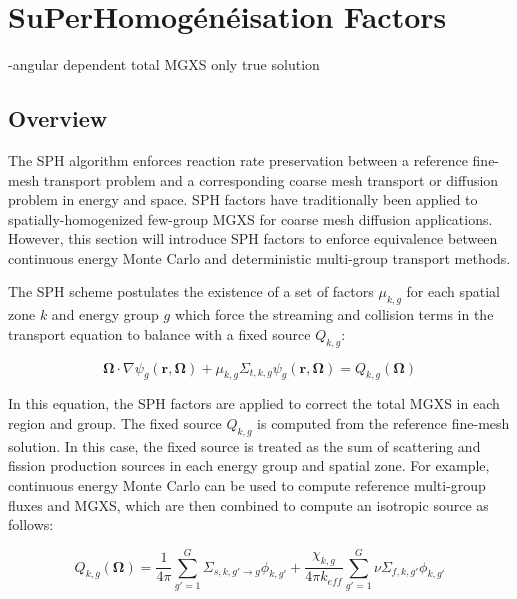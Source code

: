 \section{SuPerHomog\'{e}n\'{e}isation Factors}
\label{sec:sph}

-angular dependent total MGXS only true solution


\subsection{Overview}
\label{subsec:sph-overview}

The SPH algorithm enforces reaction rate preservation between a reference fine-mesh transport problem and a corresponding coarse mesh transport or diffusion problem in energy and space. SPH factors have traditionally been applied to spatially-homogenized few-group MGXS for coarse mesh diffusion applications. However, this section will introduce SPH factors to enforce equivalence between continuous energy Monte Carlo and deterministic multi-group transport methods. 

The SPH scheme postulates the existence of a set of factors $\mu_{k,g}$ for each spatial zone $k$ and energy group $g$ which force the streaming and collision terms in the transport equation to balance with a fixed source $Q_{k,g}$:

\begin{dmath}
\label{eqn:chap6-sph-transport-eqn}
\mathbf{\Omega} \cdot \nabla \psi_{g}(\mathbf{r},\mathbf{\Omega}) + \mu_{k,g}\Sigma_{t,k,g}\psi_{g}(\mathbf{r},\mathbf{\Omega}) = Q_{k,g}(\mathbf{\Omega})
\end{dmath}

\noindent In this equation, the SPH factors are applied to correct the total MGXS in each region and group. The fixed source $Q_{k,g}$ is computed from the reference fine-mesh solution. In this case,  the fixed source is treated as the sum of scattering and fission production sources in each energy group and spatial zone. For example, continuous energy Monte Carlo can be used to compute reference multi-group fluxes and MGXS, which are then combined to compute an isotropic source as follows:

\begin{dmath}
\label{eqn:chap6-sph-source}
Q_{k,g}(\mathbf{\Omega}) = \frac{1}{4\pi} \sum_{g'=1}^{G} \Sigma_{s,k,g' \rightarrow g}\phi_{k,g'} + \frac{\chi_{k,g}}{4\pi k_{eff}}\sum_{g'=1}^{G} \nu\Sigma_{f,k,g'}\phi_{k,g'}
\end{dmath}

